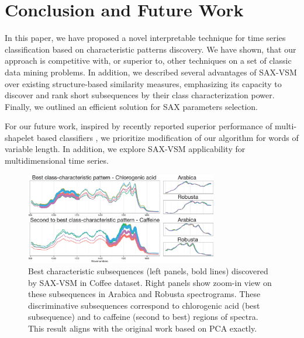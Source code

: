 \documentclass[conference]{IEEEtran}
\begin{document}
\section{Conclusion and Future Work} \label{conclusion}
In this paper, we have proposed a novel interpretable technique for time series classification
based on characteristic patterns discovery. We have shown, that our approach is competitive with, 
or superior to, other techniques on a set of classic data mining problems. In addition, 
we described several advantages of SAX-VSM over existing structure-based similarity measures,
emphasizing its capacity to discover and rank short subsequences by their class characterization
power. Finally, we outlined an efficient solution for SAX parameters selection.

For our future work, inspired by recently reported superior performance of multi-shapelet based 
classifiers \cite{bagnal}, we prioritize modification of our algorithm for words of variable length.
In addition, we explore SAX-VSM applicability for multidimensional time series. 


\begin{figure}[t]
   \centering
   \vspace{-0.2cm}
   \includegraphics[width=84mm]{figures/coffee_patterns.eps}
   \caption{
   Best characteristic subsequences (left panels, bold lines) discovered by SAX-VSM in
   {Coffee dataset}. Right panels show zoom-in view on these subsequences in Arabica
   and Robusta spectrograms.
   These discriminative subsequences correspond to chlorogenic acid (best subsequence) 
   and to caffeine (second to best) regions of spectra. This result aligns with
   the original work based on PCA \cite{coffee} exactly.
   }
   \label{fig:coffee}
   \vspace{-0.2cm}
\end{figure}
\end{document}
